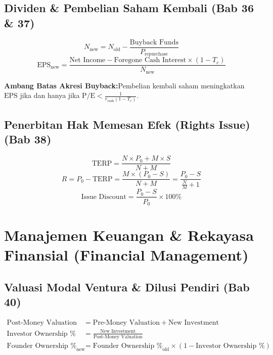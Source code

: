 \documentclass[10pt,a4paper]{article}
\newcommand{\takeaway}[2]{%
  \vspace{6pt}\noindent\colorbox{calloutbg}{%
    \parbox{\dimexpr\textwidth-2\fboxsep\relax}{%
      \vspace{3pt}\textbf{\color{primary}#1:}\hspace{0.5em}#2\vspace{3pt}%
    }%
  }\vspace{6pt}%
}
\begin{document}
\subsection{Dividen \& Pembelian Saham Kembali (Bab 36 \& 37)}

\begin{equation}
N_{\text{new}} = N_{\text{old}} - \frac{\text{Buyback Funds}}{P_{\text{repurchase}}}
\end{equation}
\begin{equation}
\text{EPS}_{\text{new}} = \frac{\text{Net Income} - \text{Foregone Cash Interest} \times (1 - T_c)}{N_{\text{new}}}
\end{equation}
\takeaway{Ambang Batas Akresi Buyback}{Pembelian kembali saham meningkatkan $\text{EPS}$ jika dan hanya jika $\text{P/E} < \frac{1}{r_{\text{cash}}(1 - T_c)}$.}

\subsection{Penerbitan Hak Memesan Efek (Rights Issue) (Bab 38)}

\begin{equation}
\text{TERP} = \frac{N \times P_0 + M \times S}{N + M}
\end{equation}
\begin{equation}
R = P_0 - \text{TERP} = \frac{M \times (P_0 - S)}{N + M} = \frac{P_0 - S}{\frac{N}{M} + 1}
\end{equation}
\begin{equation}
\text{Issue Discount} = \frac{P_0 - S}{P_0} \times 100\%
\end{equation}

\section{Manajemen Keuangan \& Rekayasa Finansial (Financial Management)}

\subsection{Valuasi Modal Ventura \& Dilusi Pendiri (Bab 40)}

\begin{align}
\text{Post-Money Valuation} &= \text{Pre-Money Valuation} + \text{New Investment} \\
\text{Investor Ownership \%} &= \frac{\text{New Investment}}{\text{Post-Money Valuation}} \\
\text{Founder Ownership \%}_{\text{new}} &= \text{Founder Ownership \%}_{\text{old}} \times (1 - \text{Investor Ownership \%})
\end{align}
\end{document}
